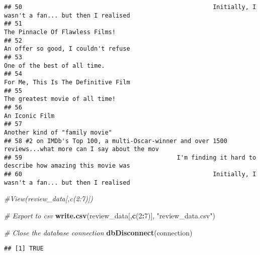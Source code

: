 \documentclass[
]{article}
\newenvironment{Shaded}{\begin{snugshade}}{\end{snugshade}}
\newcommand{\CommentTok}[1]{\textcolor[rgb]{0.56,0.35,0.01}{\textit{#1}}}
\newcommand{\DecValTok}[1]{\textcolor[rgb]{0.00,0.00,0.81}{#1}}
\newcommand{\FunctionTok}[1]{\textcolor[rgb]{0.13,0.29,0.53}{\textbf{#1}}}
\newcommand{\NormalTok}[1]{#1}
\newcommand{\SpecialCharTok}[1]{\textcolor[rgb]{0.81,0.36,0.00}{\textbf{#1}}}
\newcommand{\StringTok}[1]{\textcolor[rgb]{0.31,0.60,0.02}{#1}}
\begin{document}
\begin{verbatim}
## 50                                                     Initially, I wasn't a fan... but then I realised
## 51                                                                      The Pinnacle Of Flawless Films!
## 52                                                                  An offer so good, I couldn't refuse
## 53                                                                         One of the best of all time.
## 54                                                                  For Me, This Is The Definitive Film
## 55                                                                      The greatest movie of all time!
## 56                                                                                       An Iconic Film
## 57                                                                       Another kind of "family movie"
## 58 #2 on IMDb's Top 100, a multi-Oscar-winner and over 1500 reviews...what more can I say about the mov
## 59                                           I'm finding it hard to describe how amazing this movie was
## 60                                                     Initially, I wasn't a fan... but then I realised
\end{verbatim}

\begin{Shaded}
\begin{Highlighting}[]
\CommentTok{\#View(review\_data[,c(2:7)])}

\CommentTok{\# Export to csv}
\FunctionTok{write.csv}\NormalTok{(review\_data[,}\FunctionTok{c}\NormalTok{(}\DecValTok{2}\SpecialCharTok{:}\DecValTok{7}\NormalTok{)], }\StringTok{"review\_data.csv"}\NormalTok{)}
\end{Highlighting}
\end{Shaded}

\begin{Shaded}
\begin{Highlighting}[]
\CommentTok{\# Close the database connection}
\FunctionTok{dbDisconnect}\NormalTok{(connection)}
\end{Highlighting}
\end{Shaded}

\begin{verbatim}
## [1] TRUE
\end{verbatim}
\end{document}
